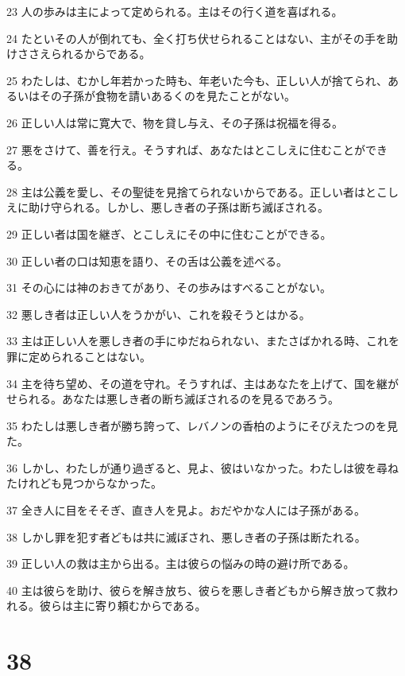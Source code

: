 \par 23 人の歩みは主によって定められる。主はその行く道を喜ばれる。
\par 24 たといその人が倒れても、全く打ち伏せられることはない、主がその手を助けささえられるからである。
\par 25 わたしは、むかし年若かった時も、年老いた今も、正しい人が捨てられ、あるいはその子孫が食物を請いあるくのを見たことがない。
\par 26 正しい人は常に寛大で、物を貸し与え、その子孫は祝福を得る。
\par 27 悪をさけて、善を行え。そうすれば、あなたはとこしえに住むことができる。
\par 28 主は公義を愛し、その聖徒を見捨てられないからである。正しい者はとこしえに助け守られる。しかし、悪しき者の子孫は断ち滅ぼされる。
\par 29 正しい者は国を継ぎ、とこしえにその中に住むことができる。
\par 30 正しい者の口は知恵を語り、その舌は公義を述べる。
\par 31 その心には神のおきてがあり、その歩みはすべることがない。
\par 32 悪しき者は正しい人をうかがい、これを殺そうとはかる。
\par 33 主は正しい人を悪しき者の手にゆだねられない、またさばかれる時、これを罪に定められることはない。
\par 34 主を待ち望め、その道を守れ。そうすれば、主はあなたを上げて、国を継がせられる。あなたは悪しき者の断ち滅ぼされるのを見るであろう。
\par 35 わたしは悪しき者が勝ち誇って、レバノンの香柏のようにそびえたつのを見た。
\par 36 しかし、わたしが通り過ぎると、見よ、彼はいなかった。わたしは彼を尋ねたけれども見つからなかった。
\par 37 全き人に目をそそぎ、直き人を見よ。おだやかな人には子孫がある。
\par 38 しかし罪を犯す者どもは共に滅ぼされ、悪しき者の子孫は断たれる。
\par 39 正しい人の救は主から出る。主は彼らの悩みの時の避け所である。
\par 40 主は彼らを助け、彼らを解き放ち、彼らを悪しき者どもから解き放って救われる。彼らは主に寄り頼むからである。

\chapter{38}

